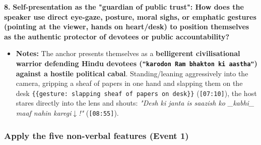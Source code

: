 \documentclass[10pt,a4paper]{article}
\begin{document}
\noindent\textbf{8.} \textbf{Self-presentation as the "guardian of public trust": How does the speaker use direct eye-gaze, posture, moral sighs, or emphatic gestures (pointing at the viewer, hands on heart/desk) to position themselves as the authentic protector of devotees or public accountability?}\par\smallskip
\begin{itemize}
  \item \textbf{Notes:}
The anchor presents themselves as a \textbf{belligerent civilisational warrior defending Hindu devotees (\texttt{"karodon Ram bhakton ki aastha"}) against a hostile political cabal}. Standing/leaning aggressively into the camera, gripping a sheaf of papers in one hand and slapping them on the desk \texttt{\{\{gesture: slapping sheaf of papers on desk\}\}} (\texttt{[07:10]}), the host stares directly into the lens and shouts: \textit{"Desh ki janta is saazish ko \_kabhi\_ maaf nahin karegi$\downarrow$!"} (\texttt{[08:55]}).\par\smallskip
\end{itemize}

\subsubsection*{Apply the five non-verbal features (Event 1)}
\end{document}
